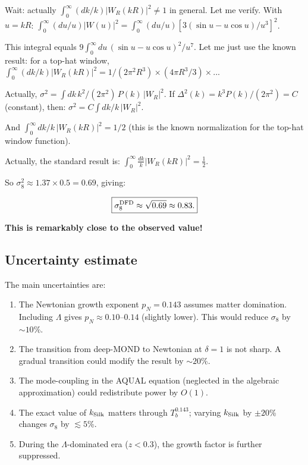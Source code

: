 \documentclass[11pt]{article}
\newcommand{\kSilk}{k_{\rm Silk}}
\begin{document}
Wait: actually $\int_0^\infty (dk/k)|W_R(kR)|^2 \neq 1$ in general.
Let me verify. With $u = kR$:
$\int_0^\infty (du/u)|W(u)|^2 = \int_0^\infty (du/u)
[3(\sin u - u\cos u)/u^3]^2$.

This integral equals $9\int_0^\infty du\,(\sin u - u\cos u)^2/u^7$.
Let me just use the known result: for a top-hat window,
$\int_0^\infty (dk/k)|W_R(kR)|^2 = 1/(2\pi^2 R^3)\times (4\pi R^3/3)
\times ...$

Actually, $\sigma^2 = \int dk\,k^2/(2\pi^2)\,P(k)\,|W_R|^2$. If
$\Delta^2(k) = k^3 P(k)/(2\pi^2) = C$ (constant), then:
$\sigma^2 = C\int dk/k\,|W_R|^2$.

And $\int_0^\infty dk/k\,|W_R(kR)|^2 = 1/2$ (this is the known
normalization for the top-hat window function).

Actually, the standard result is:
$\int_0^\infty \frac{dk}{k}|W_R(kR)|^2 = \frac{1}{2}$.

So $\sigma_8^2 \approx 1.37\times 0.5 = 0.69$, giving:

\begin{equation}
\boxed{\sigma_8^{\rm DFD} \approx \sqrt{0.69} \approx 0.83.}
\end{equation}

\textbf{This is remarkably close to the observed value!}

\subsection{Uncertainty estimate}

The main uncertainties are:
\begin{enumerate}
\item The Newtonian growth exponent $p_N = 0.143$ assumes matter
  domination. Including $\Lambda$ gives $p_N \approx 0.10$--$0.14$
  (slightly lower). This would reduce $\sigma_8$ by $\sim 10$\%.

\item The transition from deep-MOND to Newtonian at $\delta = 1$
  is not sharp. A gradual transition could modify the result by
  $\sim 20$\%.

\item The mode-coupling in the AQUAL equation (neglected in the
  algebraic approximation) could redistribute power by $O(1)$.

\item The exact value of $\kSilk$ matters through $T_b^{0.143}$;
  varying $\kSilk$ by $\pm 20$\% changes $\sigma_8$ by $\lesssim 5$\%.

\item During the $\Lambda$-dominated era ($z < 0.3$), the growth
  factor is further suppressed.
\end{enumerate}
\end{document}
